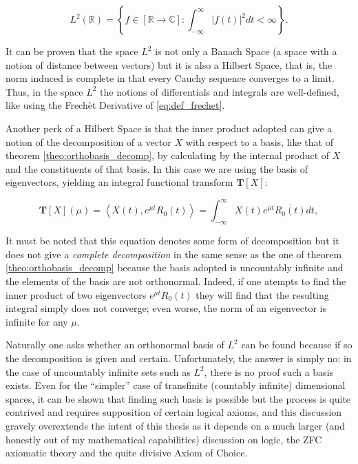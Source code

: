 \begin{equation} L^2\left(\mathbb{R}\right) = \left\{f\in\left[\mathbb{R}\to\mathbb{C}\right]: \int_{-\infty}^{\infty} \left\lvert f(t)\right\rvert^2 dt < \infty\right\}. \end{equation}

	It can be proven that the space $L^2$ is not only a Banach Space (a space with a notion of distance between vectors) but it is also a Hilbert Space, that is, the norm induced is complete in that every Cauchy sequence converges to a limit. Thus, in the space $L^2$ the notions of differentials and integrals are well-defined, like using the Frechèt Derivative of \eqref{eq:def_frechet}.

	Another perk of a Hilbert Space is that the inner product adopted can give a notion of the decomposition of a vector $X$ with respect to a basis, like that of theorem \ref{theo:orthobasis_decomp}, by calculating by the internal product of $X$ and the constituents of that basis. In this case we are using the basis of eigenvectors, yielding an integral functional transform $\mathbf{T} \left[X\right]$:

\begin{equation} \mathbf{T} \left[X\right]\left(\mu\right) = \left< X(t), e^{\mu t} R_0(t)\right> = \int_{-\infty}^{\infty} X(t) e^{\overline{\mu} t} \overline{R_0(t)}dt ,\label{eq:tmu_def}\end{equation}

	It must be noted that this equation denotes some form of decomposition but it does not give a \textit{complete decomposition} in the same sense as the one of theorem \ref{theo:orthobasis_decomp} because the basis adopted is uncountably infinite and the elements of the basis are not orthonormal. Indeed, if one atempts to find the inner product of two eigenvectors $e^{\mu t}R_0(t)$ they will find that the resulting integral simply does not converge; even worse, the norm of an eigenvector is infinite for any $\mu$.

	Naturally one asks whether an orthonormal basis of $L^2$ can be found because if so the decomposition is given and certain. Unfortunately, the answer is simply no: in the case of uncountably infinite sets such as $L^2$, there is no proof such a basis exists. Even for the ``simpler'' case of transfinite (countably infinite) dimensional spaces, it can be shown  that finding such basis is possible but the process is quite contrived and requires supposition of certain logical axioms, and this discussion gravely overextends the intent of this thesis as it depends on a much larger (and honestly out of my mathematical capabilities) discussion on logic, the ZFC axiomatic theory and the quite divisive Axiom of Choice.


